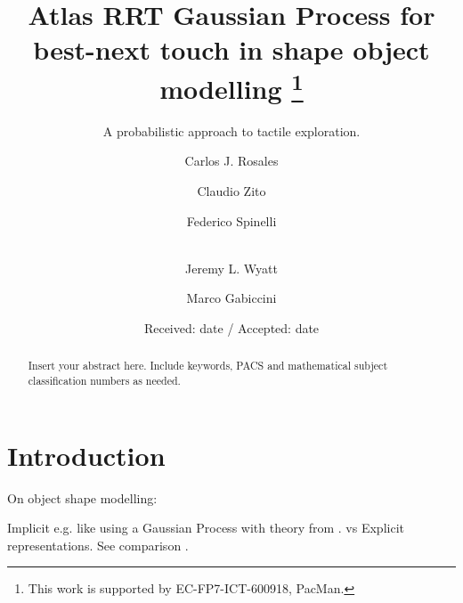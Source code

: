 \documentclass[twocolumn,draft,natbib]{svjour3}
\begin{document}
\title{Atlas RRT Gaussian Process for best-next touch in shape object modelling
  \thanks{This work is supported by EC-FP7-ICT-600918, PacMan.}
}
\subtitle{A probabilistic approach to tactile exploration.}

\author{Carlos J. Rosales         \and
        Claudio Zito              \and
        Federico Spinelli         \and \\
        Jeremy L. Wyatt           \and
        Marco Gabiccini           \and
}


\date{Received: date / Accepted: date}


\maketitle

\begin{abstract}
Insert your abstract here. Include keywords, PACS and mathematical
subject classification numbers as needed.
\end{abstract}

\section{Introduction}
\label{intro}

On object shape modelling:

Implicit e.g. like using a Gaussian Process with theory from \citet{Rasmussen2006Gaussian}. vs Explicit representations. See comparison \citet{Pirri2006About}.
\end{document}

